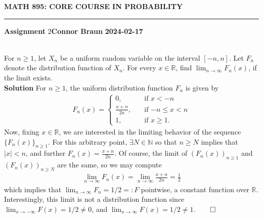 \documentclass[10pt]{article}
\newcommand{\mbb}[1]{\mathbb{#1}}
\newcommand{\1}[1]{\mathbbm{1}_{#1}}
\begin{document}
    \begin{center}
        {\bf\large{MATH 895: CORE COURSE IN PROBABILITY}}
        \smallskip
        \hrule
        \smallskip
        {\bf Assignment} 2\hfill {\bf Connor Braun} \hfill {\bf 2024-02-17}
    \end{center}
    \\[5pt]
    For $n\geq 1$, let $X_n$ be a uniform random variable on the interval $[-n,n]$. Let $F_n$ denote the distribution function of $X_n$. For every $x\in\mbb{R}$, find $\lim_{n\rightarrow\infty}F_n(x)$, if the limit exists.\\[5pt]
    {\bf Solution}\hspace{5pt} For $n\geq 1$, the uniform distribution function $F_n$ is given by
    \begin{align*}
        F_n(x)=\begin{cases}
            0,\quad&\text{if $x<-n$}\\
            \frac{x+n}{2n},\quad&\text{if $-n\leq x<n$}\\
            1,\quad&\text{if $x\geq 1$}.
        \end{cases}
    \end{align*}
    Now, fixing $x\in\mbb{R}$, we are interested in the limiting behavior of the sequence $\{F_n(x)\}_{n\geq 1}$. For this arbitrary point, $\exists N\in\mbb{N}$ so that $n\geq N$ implies that $|x|< n$, and further $F_n(x)=\tfrac{x+n}{2n}$. Of course, the limit of $(F_n(x))_{n\geq 1}$ and $(F_n(x))_{n\geq N}$ are the same, so we may compute
    \begin{align*}
        \lim_{n\rightarrow\infty} F_n(x)=\lim_{n\rightarrow\infty}\frac{x+n}{2n}=\frac{1}{2}
    \end{align*}
    which implies that $\lim_{n\rightarrow\infty}F_n=1/2=:F$ pointwise, a constant function over $\mbb{R}$. Interestingly, this limit is not a distribution function since $\lim_{x\rightarrow-\infty}F(x)=1/2\neq 0$, and $\lim_{x\rightarrow\infty}F(x)=1/2\neq 1$.\hfill{$\qed$}\\[5pt]
\end{document}
